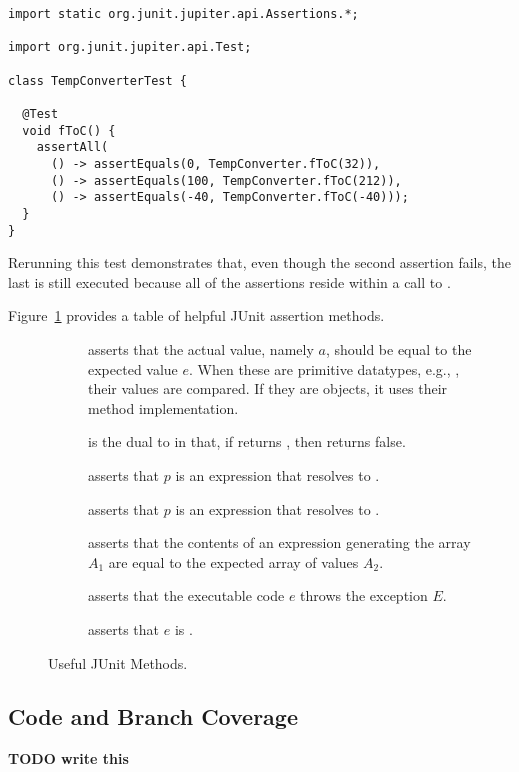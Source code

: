 \begin{lstlisting}[language=MyJava]
import static org.junit.jupiter.api.Assertions.*;

import org.junit.jupiter.api.Test;
  
class TempConverterTest {

  @Test
  void fToC() {
    assertAll(
      () -> assertEquals(0, TempConverter.fToC(32)),
      () -> assertEquals(100, TempConverter.fToC(212)),
      () -> assertEquals(-40, TempConverter.fToC(-40)));
  }
}
\end{lstlisting}
Rerunning this test demonstrates that, even though the second assertion fails, the last is still executed because all of the assertions reside within a call to . 

Figure~\ref{fig:testingmethods} provides a table of helpful JUnit assertion methods.

\begin{figure}[tp]
    \small
    \begin{tcolorbox}[title=JUnit 5 Testing Methods]
    \begin{description}
      \item [] asserts that the actual value, namely $a$, should be equal to the expected value $e$. When these are primitive datatypes, e.g., , their values are compared. If they are objects, it uses their  method implementation.
      \item [] is the dual to  in that, if  returns , then  returns false.
      \item [] asserts that $p$ is an expression that resolves to .
      \item [] asserts that $p$ is an expression that resolves to .
      \item [] asserts that the contents of an expression generating the array $A_1$ are equal to the expected array of values $A_2$. 
      \item [] asserts that the executable code $e$ throws the exception $E$.
      \item [] asserts that $e$ is .
    \end{description}
  \end{tcolorbox}
    \caption{Useful JUnit Methods.}
    \label{fig:testingmethods}
  \end{figure}

  \subsection{Code and Branch Coverage}
  \textbf{TODO write this}